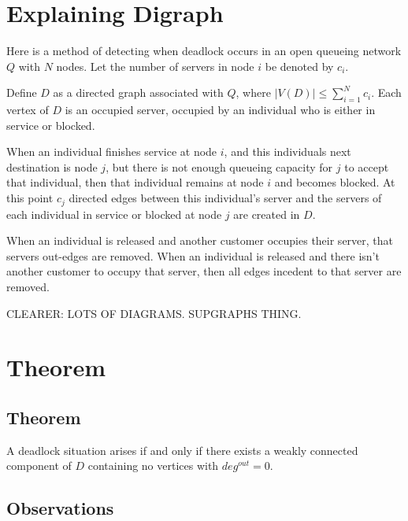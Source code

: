 \documentclass{article}
\begin{document}
\section{Explaining Digraph}

Here is a method of detecting when deadlock occurs in an open queueing network $Q$ with $N$ nodes.
Let the number of servers in node $i$ be denoted by $c_i$.\newline

Define $D$ as a directed graph associated with $Q$, where $\left| V(D) \right| \leq \sum_{i=1}^N c_i$. Each vertex of $D$ is an occupied server, occupied by an individual who is either in service or blocked.\newline

When an individual finishes service at node $i$, and this individuals next destination is node $j$, but there is not enough queueing capacity for $j$ to accept that individual, then that individual remains at node $i$ and becomes blocked.
At this point $c_j$ directed edges between this individual's server and the servers of each individual in service or blocked at node $j$ are created in $D$.\newline

When an individual is released and another customer occupies their server, that servers out-edges are removed.
When an individual is released and there isn't another customer to occupy that server, then all edges incedent to that server are removed.\newline

CLEARER: LOTS OF DIAGRAMS. SUPGRAPHS THING.



\section{Theorem}

\subsection*{Theorem}

A deadlock situation arises if and only if there exists a weakly connected component of $D$ containing no vertices with $deg^{out} = 0$.\newline

\subsection*{Observations}
\end{document}
